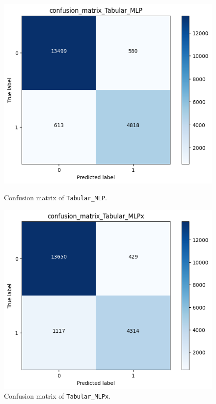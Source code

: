 \begin{figure}[!h]
    \centering
    \begin{minipage}{0.48\textwidth}
        \centering
        \captionsetup{justification=centering}
        \includegraphics[width=\linewidth]{obrazky-figures/Tabular_experiment/confusion_matrix_Tabular_MLP_2023-03-25_14:48:21.png}
        \caption{Confusion matrix of \texttt{Tabular\_MLP}.}
        \label{graph-tabular-cm-mlp}
    \end{minipage}\hfill
    \begin{minipage}{0.48\textwidth}
        \centering
        \captionsetup{justification=centering}
        \includegraphics[width=\linewidth]{obrazky-figures/Tabular_experiment/confusion_matrix_Tabular_MLPx_2023-03-25_14:48:25.png}
        \caption{Confusion matrix of \texttt{Tabular\_MLPx}.}
        \label{graph-tabular-cm-mlpx}
    \end{minipage}
\end{figure}
